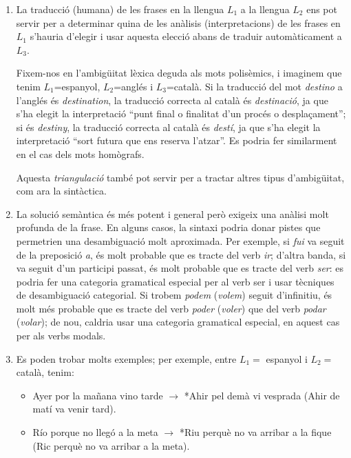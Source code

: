 \begin{enumerate}
\item La traducció (humana) de les frases en la llengua $L_1$ a la
  llengua $L_2$ ens pot servir per a determinar quina de les anàlisis
  (interpretacions) de les frases en $L_1$ s'hauria d'elegir i usar
  aquesta elecció abans de traduir automàticament a $L_3$.
      
  Fixem-nos en l'ambigüitat lèxica deguda als mots polisèmics, i
  imaginem que tenim $L_1$=espanyol, $L_2$=anglés i $L_3$=català.  Si
  la traducció del mot \emph{destino} a l'anglés és
  \emph{destination}, la traducció correcta al català és
  \emph{destinació}, ja que s'ha elegit la interpretació ``punt final
  o finalitat d'un procés o desplaçament''; si és \emph{destiny}, la
  traducció correcta al català és \emph{destí}, ja que s'ha elegit la
  interpretació ``sort futura que ens reserva l'atzar''. Es podria fer
  similarment en el cas dels mots homògrafs.
      
  Aquesta \emph{triangulació} també pot servir per a tractar altres
  tipus d'ambigüitat, com ara la sintàctica.
      
\item La solució semàntica és més potent i general però exigeix una
  anàlisi molt profunda de la frase. En alguns casos, la sintaxi
  podria donar pistes que permetrien una desambiguació molt
  aproximada. Per exemple, si {\em fui\/} va seguit de la preposició
  {\em a}, és molt probable que es tracte del verb {\em ir}; d'altra
  banda, si va seguit d'un participi passat, és molt probable que es
  tracte del verb {\em ser\/}: es podria fer una categoria gramatical
  especial per al verb ser i usar tècniques de desambiguació
  categorial. Si trobem {\em podem\/} ({\em volem\/}) seguit
  d'infinitiu, és molt més probable que es tracte del verb {\em
    poder\/} ({\em voler\/}) que del verb {\em podar} ({\em volar\/});
  de nou, caldria usar una categoria gramatical especial, en aquest
  cas per als verbs modals.
     
\item Es poden trobar molts exemples; per exemple, entre $L_1 =$
  espanyol i $L_2 =$ català, tenim:
  \begin{itemize}
  \item Ayer por la mañana vino tarde $\rightarrow$ *Ahir pel demà vi
    vesprada (Ahir de matí va venir tard).
  \item Río porque no llegó a la meta $\rightarrow$ *Riu perquè no va
    arribar a la fique (Ric perquè no va arribar a la meta).
  \end{itemize}
      

\end{enumerate}
